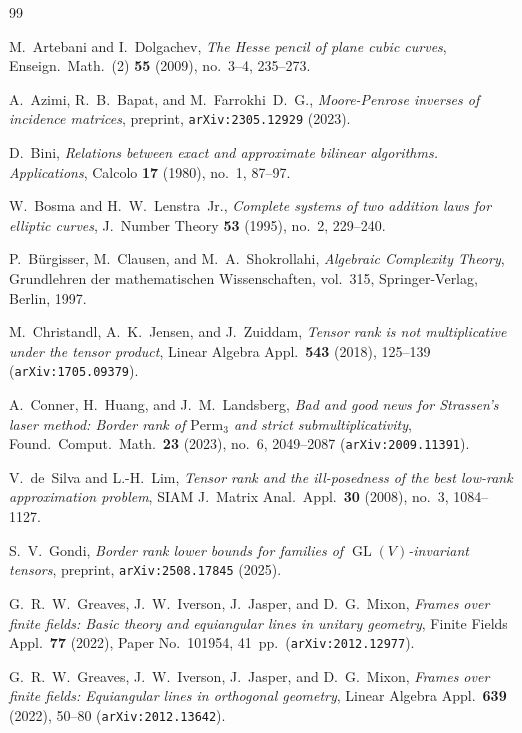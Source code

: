 \documentclass[11pt,reqno]{amsart}
\theoremstyle{definition}
\theoremstyle{remark}
\numberwithin{equation}{section}
\DeclareMathOperator{\GL}{GL}
\begin{document}
\begin{thebibliography}{99}

M.~Artebani and I.~Dolgachev,
\emph{The Hesse pencil of plane cubic curves},
Enseign.\ Math.\ (2) \textbf{55} (2009), no.~3--4, 235--273.

A.~Azimi, R.~B.~Bapat, and M.~Farrokhi~D.~G.,
\emph{Moore-Penrose inverses of incidence matrices},
preprint, \texttt{arXiv:2305.12929} (2023).

D.~Bini,
\emph{Relations between exact and approximate bilinear algorithms. Applications},
Calcolo \textbf{17} (1980), no.~1, 87--97.

W.~Bosma and H.~W.~Lenstra~Jr.,
\emph{Complete systems of two addition laws for elliptic curves},
J.~Number Theory \textbf{53} (1995), no.~2, 229--240.

P.~B\"urgisser, M.~Clausen, and M.~A.~Shokrollahi,
\emph{Algebraic Complexity Theory},
Grundlehren der mathematischen Wissenschaften, vol.~315,
Springer-Verlag, Berlin, 1997.

M.~Christandl, A.~K.~Jensen, and J.~Zuiddam,
\emph{Tensor rank is not multiplicative under the tensor product},
Linear Algebra Appl.\ \textbf{543} (2018), 125--139 (\texttt{arXiv:1705.09379}).

A.~Conner, H.~Huang, and J.~M.~Landsberg,
\emph{Bad and good news for Strassen's laser method: Border rank of $\mathrm{Perm}_3$ and strict submultiplicativity},
Found.\ Comput.\ Math.\ \textbf{23} (2023), no.~6, 2049--2087 (\texttt{arXiv:2009.11391}).

V.~de~Silva and L.-H.~Lim,
\emph{Tensor rank and the ill-posedness of the best low-rank approximation problem},
SIAM J.\ Matrix Anal.\ Appl.\ \textbf{30} (2008), no.~3, 1084--1127.

S.~V.~Gondi,
\emph{Border rank lower bounds for families of $\GL(V)$-invariant tensors},
preprint, \texttt{arXiv:2508.17845} (2025).

G.~R.~W.~Greaves, J.~W.~Iverson, J.~Jasper, and D.~G.~Mixon,
\emph{Frames over finite fields: Basic theory and equiangular lines in unitary geometry},
Finite Fields Appl.\ \textbf{77} (2022), Paper No.~101954, 41~pp.\ (\texttt{arXiv:2012.12977}).

G.~R.~W.~Greaves, J.~W.~Iverson, J.~Jasper, and D.~G.~Mixon,
\emph{Frames over finite fields: Equiangular lines in orthogonal geometry},
Linear Algebra Appl.\ \textbf{639} (2022), 50--80 (\texttt{arXiv:2012.13642}).


\end{thebibliography}
\end{document}
